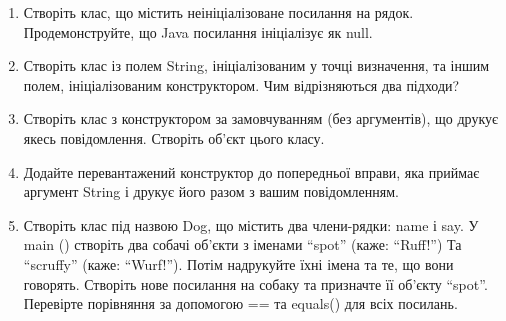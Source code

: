 \documentclass[]{article}
\begin{document}
\begin{enumerate}
\def\labelenumi{3.\arabic{enumi}.}
\item
Створіть клас, що містить неініціалізоване посилання на рядок. Продемонструйте, що Java посилання ініціалізує як null.
\item
 Створіть клас із полем String, ініціалізованим у точці визначення, та іншим полем, ініціалізованим конструктором. Чим відрізняються два підходи?
\item
 Створіть клас з конструктором за замовчуванням (без аргументів), що друкує якесь повідомлення. Створіть об’єкт цього класу.
\item
 Додайте перевантажений конструктор до попередньої вправи, яка приймає аргумент String і друкує його разом з вашим повідомленням.
\item
Створіть клас під назвою Dog, що містить два члени-рядки: name і say. У main () створіть два собачі об’єкти з іменами “spot” (каже: “Ruff!”) Та “scruffy” (каже: “Wurf!”). Потім надрукуйте їхні імена та те, що вони говорять.
Створіть нове посилання на собаку та призначте її об’єкту “spot”. Перевірте порівняння за допомогою == та equals() для всіх посилань.


\end{enumerate}
\end{document}
